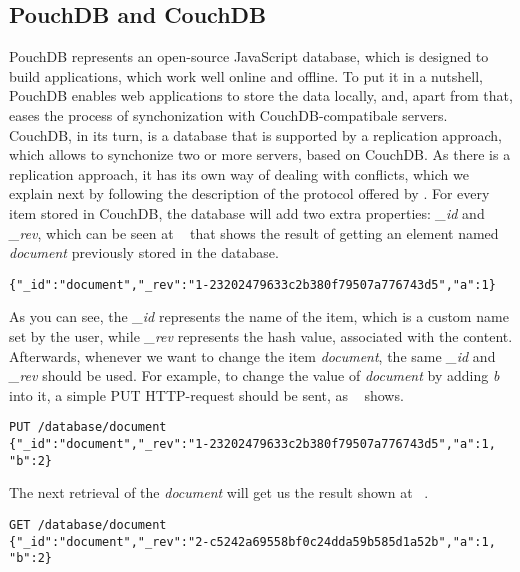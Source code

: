 \subsection*{PouchDB and CouchDB}

PouchDB represents an open-source JavaScript database, which is designed to build applications, which work well online and offline. To put it in a nutshell, PouchDB enables web applications to store the data locally, and, apart from that, eases the process of synchonization with CouchDB-compatibale servers. CouchDB, in its turn, is a database that is supported by a replication approach, which allows to synchonize two or more servers, based on CouchDB. As there is a replication approach, it has its own way of dealing with conflicts, which we explain next by following the description of the protocol offered by \citet{26}. For every item stored in CouchDB, the database will add two extra properties: \textit{\_id} and \textit{\_rev}, which can be seen at ~ that shows the result of getting an element named \textit{document} previously stored in the database.

\begin{lstlisting}[caption={A typical result of retrieving the item \textit{document} stored in CouchDB.}, label={lst:rwork1}]
{"_id":"document","_rev":"1-23202479633c2b380f79507a776743d5","a":1}
\end{lstlisting}

As you can see, the \textit{\_id} represents the name of the item, which is a custom name set by the user, while \textit{\_rev} represents the hash value, associated with the content. Afterwards, whenever we want to change the item \textit{document}, the same \textit{\_id} and \textit{\_rev} should be used. For example, to change the value of \textit{document} by adding \textit{b} into it, a simple PUT HTTP-request should be sent, as ~ shows.

\begin{lstlisting}[caption={Updating the value of item \textit{document} by adding \textit{b} into it.}, label={lst:rwork2}]
PUT /database/document
{"_id":"document","_rev":"1-23202479633c2b380f79507a776743d5","a":1, "b":2}
\end{lstlisting}

The next retrieval of the \textit{document} will get us the result shown at ~.

\begin{lstlisting}[caption={The result of requesting the updated version of \textit{document}}, label={lst:rwork3}]
GET /database/document
{"_id":"document","_rev":"2-c5242a69558bf0c24dda59b585d1a52b","a":1, "b":2}
\end{lstlisting}

